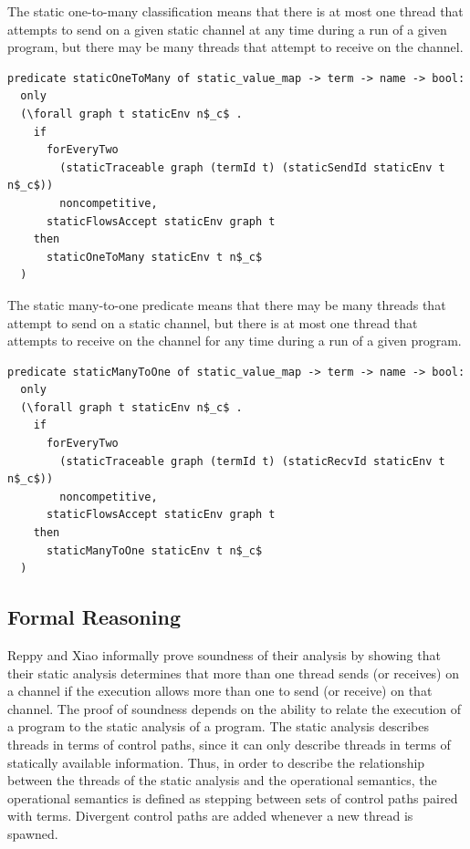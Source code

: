 \documentclass[10pt]{article}
\begin{document}
The static one-to-many classification means that there is at most one thread that attempts to
send on a given static channel at any time during a run of a given program, but there may be
many threads that attempt to receive on the channel.

\begin{lstlisting}[language=logic, mathescape]
  predicate staticOneToMany of static_value_map -> term -> name -> bool:
  only
  (\forall graph t staticEnv n$_c$ .
    if
      forEveryTwo
        (staticTraceable graph (termId t) (staticSendId staticEnv t n$_c$))
        noncompetitive,
      staticFlowsAccept staticEnv graph t 
    then
      staticOneToMany staticEnv t n$_c$
  ) 
\end{lstlisting}

The static many-to-one predicate means
that there may be many threads that attempt to send on a static channel, but there is at most
one thread that attempts to receive on the channel for any time during a run of a given
program.

\begin{lstlisting}[language=logic, mathescape]
  predicate staticManyToOne of static_value_map -> term -> name -> bool:
  only
  (\forall graph t staticEnv n$_c$ .
    if
      forEveryTwo
        (staticTraceable graph (termId t) (staticRecvId staticEnv t n$_c$))
        noncompetitive,
      staticFlowsAccept staticEnv graph t 
    then
      staticManyToOne staticEnv t n$_c$
  ) 
\end{lstlisting}

\subsection{Formal Reasoning}

Reppy and Xiao informally prove soundness of their analysis by showing that their static analysis
determines that more than one thread sends (or receives) on a channel if the execution allows more
than one to send (or receive) on that channel. The proof of soundness depends on the
ability to relate the execution of a program to the static analysis of a program. The static
analysis describes threads in terms of control paths, since it can only describe threads in
terms of statically available information. Thus, in order to describe the relationship between
the threads of the static analysis and the operational semantics, the operational semantics is
defined as stepping between sets of control paths paired with terms. Divergent control paths
are added whenever a new thread is spawned.
\end{document}

